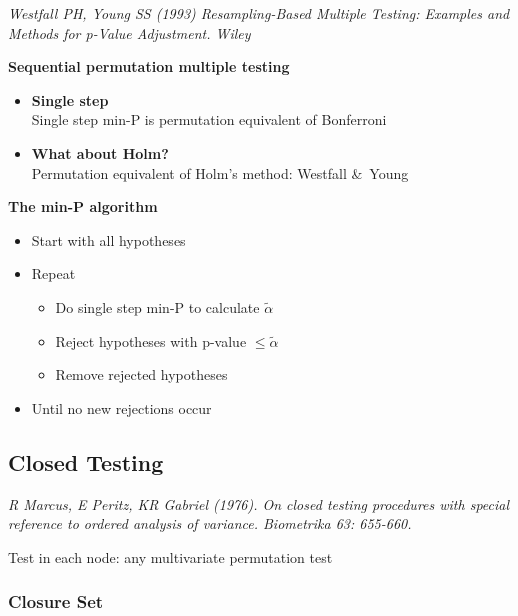 \documentclass[
]{article}
\providecommand{\tightlist}{%
  \setlength{\itemsep}{0pt}\setlength{\parskip}{0pt}}
\begin{document}
\emph{Westfall PH, Young SS (1993) Resampling-Based Multiple Testing:
Examples and Methods for p-Value Adjustment. Wiley}

\textbf{Sequential permutation multiple testing}

\begin{itemize}
\tightlist
\item
  \textbf{Single step}\\
  Single step min-P is permutation equivalent of Bonferroni\\
\item
  \textbf{What about Holm?}\\
  Permutation equivalent of Holm's method: Westfall \&~Young
\end{itemize}

\textbf{The min-P algorithm}

\begin{itemize}
\tightlist
\item
  Start with all hypotheses
\item
  Repeat

  \begin{itemize}
  \tightlist
  \item
    Do single step min-P to calculate \(\tilde\alpha\)\\
  \item
    Reject hypotheses with p-value \(\leq \tilde\alpha\)\\
  \item
    Remove rejected hypotheses\\
  \end{itemize}
\item
  Until no new rejections occur
\end{itemize}

\hypertarget{closed-testing}{%
\subsection{Closed Testing}\label{closed-testing}}

\emph{R Marcus, E Peritz, KR Gabriel (1976). On closed testing
procedures with special reference to ordered analysis of variance.
Biometrika 63: 655-660.}

Test in each node: any multivariate permutation test

\hypertarget{closure-set}{%
\subsubsection{Closure Set}\label{closure-set}}
\end{document}
